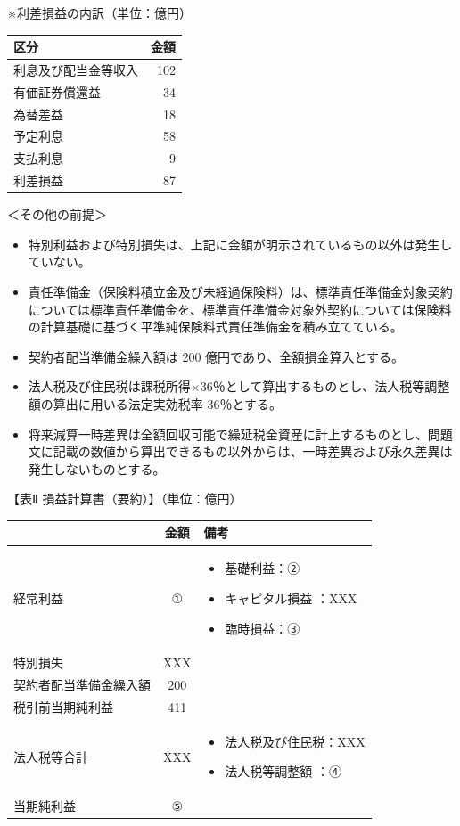 \documentclass[report,gutter=10mm,fore-edge=10mm,uplatex,dvipdfmx]{jlreq}
\begin{document}
※利差損益の内訳（単位：億円） 

\begin{tabular}{|l|r|}
\hline
区分& 金額\\ \hline
利息及び配当金等収入&102\\ \hline
有価証券償還益&34\\ \hline
為替差益&18\\ \hline
予定利息&58\\ \hline
支払利息&9\\ \hline
利差損益&87\\ \hline
\end{tabular}

＜その他の前提＞
\begin{itemize}
\item 特別利益および特別損失は、上記に金額が明示されているもの以外は発生していない。
\item 責任準備金（保険料積立金及び未経過保険料）は、標準責任準備金対象契約については標準責任準備金を、標準責任準備金対象外契約については保険料の計算基礎に基づく平準純保険料式責任準備金を積み立てている。
\item 契約者配当準備金繰入額は 200 億円であり、全額損金算入とする。
\item 法人税及び住民税は課税所得×36％として算出するものとし、法人税等調整額の算出に用いる法定実効税率 36％とする。
\item 将来減算一時差異は全額回収可能で繰延税金資産に計上するものとし、問題文に記載の数値から算出できるもの以外からは、一時差異および永久差異は発生しないものとする。
\end{itemize}

【表Ⅱ 損益計算書（要約）】（単位：億円）

\begin{tabularx}{\textwidth}{|l|c|X|}
\hline
 & 金額 & 備考\\ \hline
 経常利益 & ① & \begin{itemize}
		  \item 基礎利益：②
		  \item キャピタル損益 ：XXX
		  \item 臨時損益：③
		 \end{itemize}\\ \hline
 特別損失 & XXX &\\ \hline
 契約者配当準備金繰入額 & 200 &\\ \hline
 税引前当期純利益 & 411 &\\ \hline
 法人税等合計 & XXX & \begin{itemize}
		       \item 法人税及び住民税：XXX
		       \item 法人税等調整額 ：④
		      \end{itemize}\\ \hline
 当期純利益 & ⑤ &\\ \hline
\end{tabularx}
\end{document}
